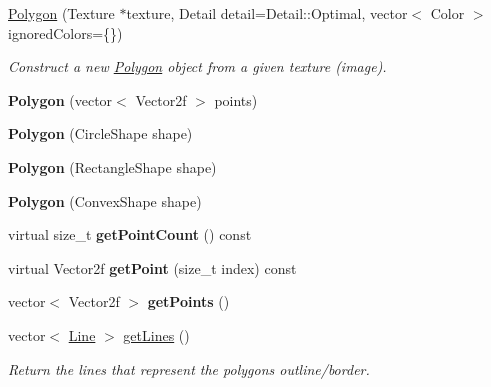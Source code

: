 \begin{DoxyCompactItemize}
\item 
\mbox{\hyperlink{class_polygon_a55f28f7bcae8df65ea11b99ff192b7d7}{Polygon}} (Texture $\ast$texture, Detail detail=Detail\+::\+Optimal, vector$<$ Color $>$ ignored\+Colors=\{\})
\begin{DoxyCompactList}\small\item\em Construct a new \mbox{\hyperlink{class_polygon}{Polygon}} object from a given texture (image). \end{DoxyCompactList}\item 
\mbox{\label{class_polygon_ac44cbd15f8a7a389d9f553e1bdeceea0}} 
{\bfseries Polygon} (vector$<$ Vector2f $>$ points)
\item 
\mbox{\label{class_polygon_abb2febc822883a9bbc7fdfac64475539}} 
{\bfseries Polygon} (Circle\+Shape shape)
\item 
\mbox{\label{class_polygon_ac83748b0a87551cc4e190254303f9911}} 
{\bfseries Polygon} (Rectangle\+Shape shape)
\item 
\mbox{\label{class_polygon_a37104a58675193c3598c19b41f4eadda}} 
{\bfseries Polygon} (Convex\+Shape shape)
\item 
\mbox{\label{class_polygon_af16db77f60fa0f12b72cf0517aca0669}} 
virtual size\+\_\+t {\bfseries get\+Point\+Count} () const
\item 
\mbox{\label{class_polygon_a336e2540d24e30a4be6be163e2137323}} 
virtual Vector2f {\bfseries get\+Point} (size\+\_\+t index) const
\item 
\mbox{\label{class_polygon_a5013385231c9027d00cb57dffc030ae4}} 
vector$<$ Vector2f $>$ {\bfseries get\+Points} ()
\item 
vector$<$ \mbox{\hyperlink{class_line}{Line}} $>$ \mbox{\hyperlink{class_polygon_acbeaa5a9990ee704fdfa766d4a34b86c}{get\+Lines}} ()
\begin{DoxyCompactList}\small\item\em Return the lines that represent the polygon\textquotesingle{}s outline/border. \end{DoxyCompactList}\item 

\end{DoxyCompactItemize}
